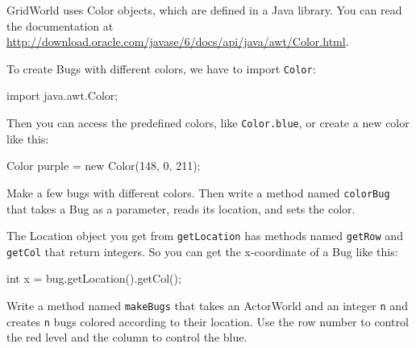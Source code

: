 \begin{exercise}

GridWorld uses Color objects, which are defined in a Java library.
You can read the documentation at
\url{http://download.oracle.com/javase/6/docs/api/java/awt/Color.html}.

To create Bugs with different colors, we have to import
{\tt Color}:

\begin{code}
import java.awt.Color;
\end{code}

Then you can access the predefined colors, like {\tt Color.blue}, or
create a new color like this:

\begin{code}
    Color purple = new Color(148, 0, 211);
\end{code}

Make a few bugs with different colors.  Then write a method named
{\tt colorBug} that takes a Bug as a parameter, reads its location,
and sets the color.

The Location object you get from
{\tt getLocation} has methods named {\tt getRow} and {\tt getCol} that
return integers.  So you can get the x-coordinate of a Bug like this:

\begin{code}
    int x = bug.getLocation().getCol();
\end{code}

Write a method named {\tt makeBugs} that takes an ActorWorld and an
integer {\tt n} and creates {\tt n} bugs colored according to their
location.  Use the row number to control the red level and the column
to control the blue.

\end{exercise}



